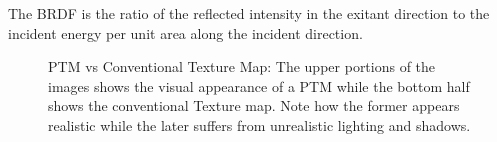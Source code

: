 The BRDF is the ratio of the reflected intensity in the exitant direction to the incident
energy per unit area along the incident direction.
\begin{center}
\begin{figure}[t]
\centering
{} \caption{PTM vs Conventional Texture Map: The upper portions of the images shows the visual appearance of
a PTM while the bottom half shows the conventional Texture map. Note how the former appears realistic while
the later suffers from unrealistic lighting and shadows.
} \label{fig:subfigureExample}
\end{figure}
\end{center}
% 
